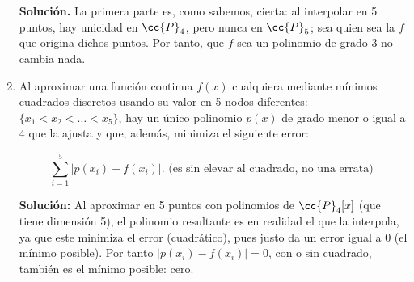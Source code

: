 \documentclass[12pt]{article}
\begin{document}
\begin{ejercicio}[4 puntos]
\begin{enumerate}[label=\alph*)]
				\textbf{Solución.}  La primera parte es, como sabemos, cierta: al interpolar en 5 puntos, hay unicidad en $\cc{P}_4$, pero nunca en $\cc{P}_5$; sea quien sea la $f$ que origina dichos puntos. Por tanto, que $f$ sea un polinomio de grado 3 no cambia nada.
			
			\item Al aproximar una función continua $f(x)$ cualquiera mediante mínimos cuadrados discretos usando su valor en 5 nodos diferentes: $\{x_1 < x_2 < \dots < x_5\}$, hay un único polinomio $ p(x)$ de grado menor o igual a 4 que la ajusta y que, además, minimiza el siguiente error:
			
			$$\sum_{i=1}^{5} |p(x_i) - f(x_i)|. \text{ (es sin elevar al cuadrado, no una errata) }$$
			
				\textbf{Solución:}  Al aproximar en 5 puntos con polinomios de $ \cc{P}_4[x] $ (que tiene dimensión 5), el polinomio resultante es en realidad el que la interpola, ya que este minimiza el error (cuadrático), pues justo da un error igual a 0 (el mínimo posible). Por tanto $|p(x_i) - f(x_i)| = 0$, con o sin cuadrado, también es el mínimo posible: cero.
			
		\end{enumerate} 
	\end{ejercicio}
\end{document}
